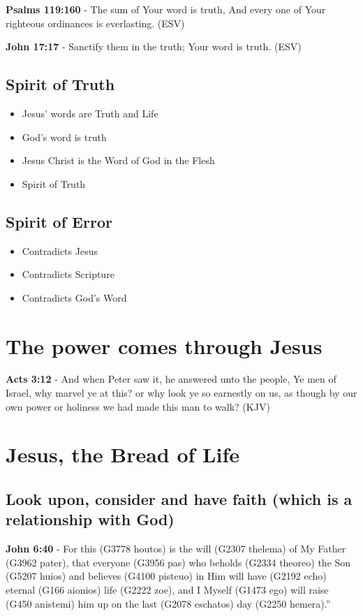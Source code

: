 \documentclass[11pt]{article}
\begin{document}
\textbf{Psalms 119:160} - The sum of Your word is truth, And every one of Your righteous ordinances is everlasting. (ESV)

\textbf{John 17:17} - Sanctify them in the truth; Your word is truth. (ESV)

\subsection{Spirit of Truth}
\label{sec:org0d16c31}
\begin{itemize}
\item Jesus' words are Truth and Life
\item God's word is truth
\item Jesus Christ is the Word of God in the Flesh
\item Spirit of Truth
\end{itemize}

\subsection{Spirit of Error}
\label{sec:org54b96d5}
\begin{itemize}
\item Contradicts Jesus
\item Contradicts Scripture
\item Contradicts God's Word
\end{itemize}

\section{The power comes through Jesus}
\label{sec:orgbd732c6}
\textbf{Acts 3:12} - And when Peter saw it, he answered unto the people, Ye men of Israel, why marvel ye at this? or why look ye so earnestly on us, as though by our own power or holiness we had made this man to walk? (KJV)

\section{Jesus, the Bread of Life}
\label{sec:org58872c3}
\subsection{Look upon, consider and have faith (which is a relationship with God)}
\label{sec:org73f9529}
\textbf{John 6:40} - For this (G3778 houtos) is the will (G2307 thelema) of My Father (G3962 pater), that everyone (G3956 pas) who beholds (G2334 theoreo) the Son (G5207 huios) and believes (G4100 pisteuo) in Him will have (G2192 echo) eternal (G166 aionios) life (G2222 zoe), and I Myself (G1473 ego) will raise (G450 anistemi) him up on the last (G2078 eschatos) day (G2250 hemera).”
\end{document}
